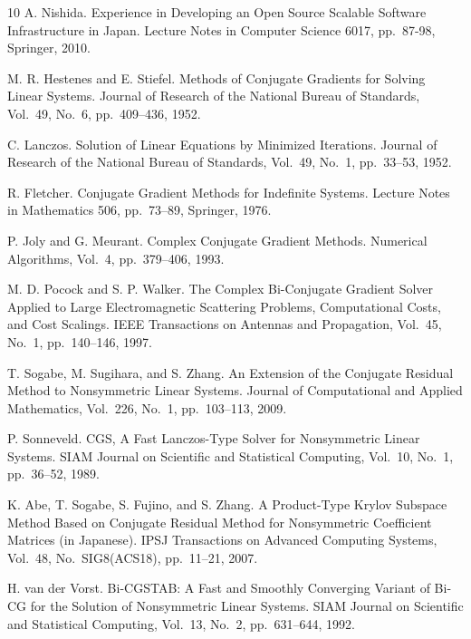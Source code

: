 \documentclass[a4paper]{article}
\begin{document}
\newpage
{}
\begin{thebibliography}{10}
A. Nishida.
\newblock Experience in Developing an Open Source Scalable Software
	Infrastructure in Japan.
\newblock Lecture Notes in Computer Science 6017, pp.\ 87-98, Springer, 2010.

M. R. Hestenes and E. Stiefel.
\newblock Methods of Conjugate Gradients for Solving Linear Systems.
\newblock Journal of Research of the National Bureau of Standards, Vol.~49, No.~6, pp.\ 409--436, 1952.

C. Lanczos.
\newblock Solution of Linear Equations by Minimized Iterations.
\newblock Journal of Research of the National Bureau of Standards, Vol.~49, No.~1, pp.\ 33--53, 1952.

R. Fletcher.
\newblock Conjugate Gradient Methods for Indefinite Systems.
\newblock Lecture Notes in Mathematics 506, pp.\ 73--89, Springer, 1976.

P. Joly and G. Meurant.
\newblock Complex Conjugate Gradient Methods.
\newblock Numerical Algorithms, Vol.~4, pp.\ 379--406, 1993.

M. D. Pocock and S. P. Walker.
\newblock The Complex Bi-Conjugate Gradient Solver Applied to Large Electromagnetic Scattering Problems, Computational Costs, and Cost Scalings.
\newblock IEEE Transactions on Antennas and Propagation, Vol.~45, No.~1, pp.\ 140--146, 1997.

T. Sogabe, M. Sugihara, and S. Zhang.
\newblock An Extension of the Conjugate Residual Method to Nonsymmetric Linear Systems.
\newblock Journal of Computational and Applied Mathematics, Vol.~226,
	No.~1, pp.\ 103--113, 2009.

P. Sonneveld.
\newblock CGS, A Fast Lanczos-Type Solver for Nonsymmetric Linear Systems.
\newblock SIAM Journal on Scientific and Statistical Computing, Vol.~10, No.~1, pp.\ 36--52, 1989.

K. Abe, T. Sogabe, S. Fujino, and S. Zhang.
\newblock A Product-Type Krylov Subspace Method Based on Conjugate Residual Method for Nonsymmetric Coefficient Matrices (in Japanese).
\newblock IPSJ Transactions on Advanced Computing Systems,  Vol.~48, No.~SIG8(ACS18), pp.\ 11--21, 2007.

H. van der Vorst.
\newblock Bi-CGSTAB: A Fast and Smoothly Converging Variant of Bi-CG for
	the Solution of Nonsymmetric Linear Systems.
\newblock SIAM Journal on Scientific and Statistical Computing, Vol.~13, No.~2, pp.\ 631--644, 1992.


\end{thebibliography}
\end{document}
